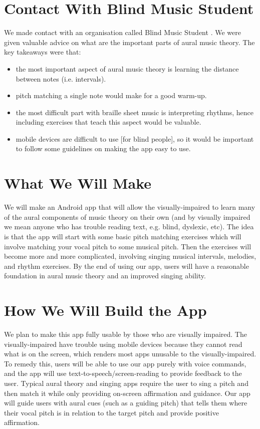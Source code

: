 \documentclass{article}
\begin{document}
\section{Contact With Blind Music Student}
We made contact with an organisation called Blind Music Student \cite{blindmusicstudent}. We were given valuable advice on what are the important parts of aural music theory. The key takeaways were that:
\begin{itemize}
	\item the most important aspect of aural music theory is learning the distance between notes (i.e.  intervals).
	\item pitch matching a single note would make for a good warm-up.
	\item the most difficult part with braille sheet music is interpreting rhythms, hence including exercises that teach this aspect would be valuable.
	\item mobile devices are difficult to use [for blind people], so it would be important to follow some guidelines on making the app easy to use.
\end{itemize}

\section{What We Will Make}
We will make an Android app that will allow the visually-impaired to learn many of the aural components of music theory on their own (and by visually impaired we mean anyone who has trouble reading text, e.g. blind, dyslexic, etc). The idea is that the app will start with some basic pitch matching exercises which will involve matching your vocal pitch to some musical pitch. Then the exercises will become more and more complicated, involving singing musical intervals, melodies, and rhythm exercises. By the end of using our app, users will have a reasonable foundation in aural music theory and an improved singing ability. 


\section{How We Will Build the App}
We plan to make this app fully usable by those who are visually impaired. The visually-impaired have trouble using mobile devices because they cannot read what is on the screen, which renders most apps unusable to the visually-impaired. To remedy this, users will be able to use our app purely with voice commands, and the app will use text-to-speech/screen-reading to provide feedback to the user. Typical aural theory and singing apps require the user to sing a pitch and then match it while only providing on-screen affirmation and guidance. Our app will guide users with aural cues (such as a guiding pitch) that tells them where their vocal pitch is in relation to the target pitch and provide positive affirmation.
\end{document}
